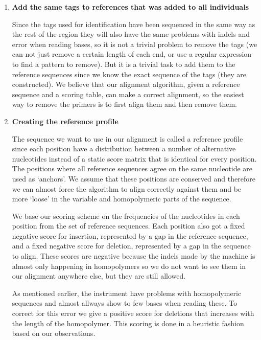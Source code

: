\documentclass[a4paper,11pt]{kth-mag}
\begin{document}
\begin{enumerate}

	\item \textbf{Add the same tags to references that was added to all individuals}

Since the tags used for identification have been sequenced in the same way as the rest of the region they will also have the same problems with indels and error when reading bases, so it is not a trivial problem to remove the tags (we can not just remove a certain length of each end, or use a regular expression to find a pattern to remove). But it is a trivial task to add them to the reference sequences since we know the exact sequence of the tags (they are constructed). We believe that our alignment algorithm, given a reference sequence and a scoring table, can make a correct alignment, so the easiest way to remove the primers is to first align them and then remove them.

	\item \textbf{Creating the reference profile}

The sequence we want to use in our alignment is called a reference profile since each position have a distribution between a number of alternative nucleotides instead of a static score matrix that is identical for every position. The positions where all reference sequences agree on the same nucleotide are used as `anchors'. We assume that these positions are conserved and therefore we can almost force the algorithm to align correctly against them and be more `loose' in the variable and homopolymeric parts of the sequence.

We base our scoring scheme on the frequencies of the nucleotides in each position from the set of reference sequences. Each position also got a fixed negative score for insertion, represented by a gap in the reference sequence, and a fixed negative score for deletion, represented by a gap in the sequence to align. These scores are negative because the indels made by the machine is almost only happening in homopolymers so we do not want to see them in our alignment anywhere else, but they are still allowed.

As mentioned earlier, the instrument have problems with homopolymeric sequences and almost allways show to few bases when reading these. To correct for this error we give a positive score for deletions that increases with the length of the homopolymer. This scoring is done in a heuristic fashion based on our observations.

\vspace{10 mm}


\end{enumerate}
\end{document}
